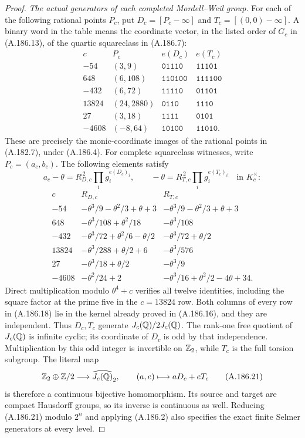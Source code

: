 \begin{proof}
\emph{The actual generators of each completed Mordell--Weil group.}
For each of the following rational points \(P_c\), put
\(D_c=[P_c-\infty]\) and
\(T_c=[(0,0)-\infty]\).  A binary word in the table
means the coordinate vector, in the listed order of
\(G_c\) in (A.186.13), of the quartic squareclass
in (A.186.7):
\[
\begin{array}{r|c|c|c}
c&P_c&e(D_c)&e(T_c)\\ \hline
-54&(3,9)&\mathtt{01110}&\mathtt{11101}\\
648&(6,108)&\mathtt{110100}&\mathtt{111100}\\
-432&(6,72)&\mathtt{11110}&\mathtt{01101}\\
13824&(24,2880)&\mathtt{0110}&\mathtt{1110}\\
27&(3,18)&\mathtt{1111}&\mathtt{0101}\\
-4608&(-8,64)&\mathtt{10100}&\mathtt{11010}.
\end{array}
\tag{A.186.18}
\]
These are precisely the monic-coordinate images of the
rational points in (A.182.7), under (A.186.4).
For complete squareclass witnesses, write
\(P_c=(a_c,b_c)\).  The following elements satisfy
\[
 a_c-\theta=R_{D,c}^{\,2}\prod_i g_i^{e(D_c)_i},
 \qquad
 -\theta=R_{T,c}^{\,2}\prod_i g_i^{e(T_c)_i}
 \quad\text{in }K_c^\times:
\tag{A.186.19}
\]
\[
\begin{array}{r|c|c}
c&R_{D,c}&R_{T,c}\\ \hline
-54&-\theta^3/9-\theta^2/3+\theta+3
    &-\theta^3/9-\theta^2/3+\theta+3\\
648&-\theta^3/108+\theta^2/18&-\theta^3/108\\
-432&-\theta^3/72+\theta^2/6-\theta/2
     &-\theta^3/72+\theta/2\\
13824&-\theta^3/288+\theta/2+6&-\theta^3/576\\
27&-\theta^3/18+\theta/2&-\theta^3/9\\
-4608&-\theta^2/24+2&-\theta^3/16+\theta^2/2-4\theta+34.
\end{array}
\tag{A.186.20}
\]
Direct multiplication modulo \(\theta^4+c\) verifies
all twelve identities, including the square factor
at the prime five in the \(c=13824\) row.  Both
columns of every row in (A.186.18) lie in the kernel
already proved in (A.186.16), and they are independent.
Thus \(D_c,T_c\) generate \(J_c(\mathbb Q)/2J_c(\mathbb Q)\).
The rank-one free quotient of \(J_c(\mathbb Q)\) is
infinite cyclic; its coordinate of \(D_c\) is odd
by that independence.  Multiplication by this odd
integer is invertible on \(\mathbb Z_2\), while \(T_c\)
is the full torsion subgroup.  The literal map
\[
 \mathbb Z_2\oplus\mathbb Z/2\longrightarrow\widehat{J_c(\mathbb Q)}_2,
          \qquad(a,e)\longmapsto aD_c+eT_c
\tag{A.186.21}
\]
is therefore a continuous bijective homomorphism.
Its source and target are compact Hausdorff groups,
so its inverse is continuous as well.  Reducing
(A.186.21) modulo \(2^n\) and applying (A.186.2)
also specifies the exact finite Selmer generators
at every level.


\end{proof}
